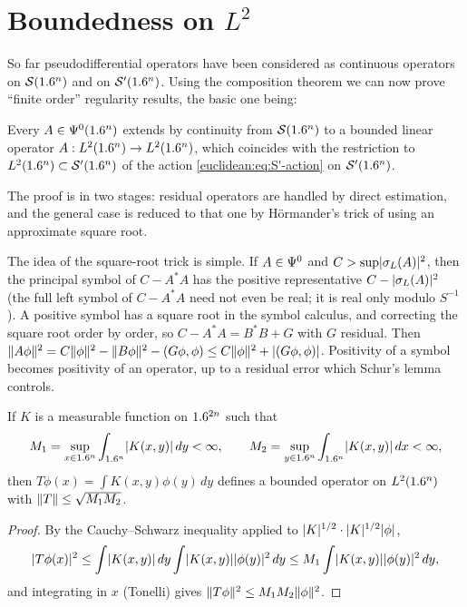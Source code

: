 \section{Boundedness on \texorpdfstring{$L^2$}{L2}}\label{euclidean:sec:L2}

So far pseudodifferential operators have been considered as continuous
operators on $\mathcal{S}(1.6^n)$ and on $\mathcal{S}'(1.6^n)$. Using the composition theorem we
can now prove ``finite order'' regularity results, the basic one being:

\begin{theorem}\label{euclidean:thm:L2}
  Every $A\in\Psi^{0}(1.6^n)$ extends by continuity from $\mathcal{S}(1.6^n)$ to a
  bounded linear operator $A:L^2(1.6^n)\to L^2(1.6^n)$, which coincides with the
  restriction to $L^2(1.6^n)\subset\mathcal{S}'(1.6^n)$ of the action
  \eqref{euclidean:eq:S'-action} on $\mathcal{S}'(1.6^n)$.
\end{theorem}

The proof is in two stages: residual operators are handled by direct
estimation, and the general case is reduced to that one by H\"ormander's
trick of using an approximate square root.

\begin{discussion}
The idea of the square-root trick is simple. If $A\in\Psi^{0}$ and $C>\sup\lvert \sigma_L(A)\rvert^2$,
then the principal symbol of $C-A^*A$ has the positive representative
$C-\lvert \sigma_L(A)\rvert^2$ (the full left symbol of $C-A^*A$ need not even be real; it is
real only modulo $S^{-1}$). A positive symbol has a square root in the
symbol calculus, and correcting the square root order by order, so $C-A^*A=B^*B+G$ with $G$ residual. Then
$\lVert A\phi\rVert^2=C\lVert \phi\rVert^2-\lVert B\phi\rVert^2-( G\phi, \phi)\le C\lVert \phi\rVert^2+\lvert ( G\phi, \phi)\rvert$.
Positivity of a symbol becomes positivity of an operator, up to a residual error which
Schur's lemma controls.
\end{discussion}


\begin{lemma}[Schur]\label{euclidean:lem:schur}
  If $K$ is a measurable function on $1.6^{2n}$ such that
  \begin{equation*}
    M_1=\sup_{x\in1.6^n}\int_{1.6^n}\lvert K(x,y)\rvert\,dy<\infty,\qquad
    M_2=\sup_{y\in1.6^n}\int_{1.6^n}\lvert K(x,y)\rvert\,dx<\infty,
  \end{equation*}
  then $T\phi(x)=\int K(x,y)\phi(y)\,dy$ defines a bounded operator on
  $L^2(1.6^n)$ with $\lVert T\rVert\le\sqrt{M_1M_2}$.
\end{lemma}
\begin{proof}
  By the Cauchy--Schwarz inequality applied to
  $\lvert K\rvert^{1/2}\cdot\lvert K\rvert^{1/2}\lvert \phi\rvert$,
  \begin{equation*}
    \lvert T\phi(x)\rvert^2\le\int\lvert K(x,y)\rvert\,dy\int\lvert K(x,y)\rvert\lvert \phi(y)\rvert^2\,dy
    \le M_1\int\lvert K(x,y)\rvert\lvert \phi(y)\rvert^2\,dy,
  \end{equation*}
  and integrating in $x$ (Tonelli) gives
  $\lVert T\phi\rVert^2\le M_1M_2\lVert \phi\rVert^2$.
\end{proof}

